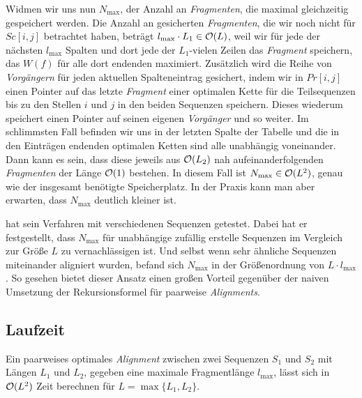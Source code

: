 Widmen wir uns nun $N_{\max}$, der Anzahl an \emph{Fragmenten}, die maximal gleichzeitig gespeichert werden. Die Anzahl an gesicherten \emph{Fragmenten}, die wir noch nicht für $Sc[i,j]$ betrachtet haben, beträgt $l_{\max} \cdot L_1 \in \mathcal{O}(L)$, weil wir für jede der nächsten $l_{\max}$ Spalten und dort jede der $L_1$-vielen Zeilen das \emph{Fragment} speichern, das $W(f)$ für alle dort endenden maximiert. Zusätzlich wird die Reihe von \emph{Vorgängern} für jeden aktuellen Spalteneintrag gesichert, indem wir in $Pr[i,j]$ einen Pointer auf das letzte \emph{Fragment} einer optimalen Kette für die Teilsequenzen bis zu den Stellen $i$ und $j$ in den beiden Sequenzen speichern. Dieses wiederum speichert einen Pointer auf seinen eigenen \emph{Vorgänger} und so weiter. Im schlimmsten Fall befinden wir uns in der letzten Spalte der Tabelle und die in den Einträgen endenden optimalen Ketten sind alle unabhängig voneinander. Dann kann es sein, dass diese jeweils aus $\mathcal{O}(L_2)$ nah aufeinanderfolgenden \emph{Fragmenten} der Länge $\mathcal{O}(1)$ bestehen. In diesem Fall ist $N_{\max} \in \mathcal{O}(L^2)$, genau wie der insgesamt benötigte Speicherplatz. In der Praxis kann man aber erwarten, dass $N_{\max}$ deutlich kleiner ist. 

\cite{m02} hat sein Verfahren mit verschiedenen Sequenzen getestet. Dabei hat er festgestellt, dass $N_{\max}$ für unabhängige zufällig erstelle Sequenzen im Vergleich zur Größe $L$ zu vernachlässigen ist. Und selbst wenn sehr ähnliche Sequenzen miteinander aligniert wurden, befand sich $N_{\max}$ in der Größenordnung von $L \cdot l_{\max}$. So gesehen bietet dieser Ansatz einen großen Vorteil gegenüber der naiven Umsetzung der Rekursionsformel für paarweise \emph{Alignments}.

\subsection{Laufzeit}

\begin{satz}
	Ein paarweises optimales \emph{Alignment} zwischen zwei Sequenzen $S_1$ und $S_2$ mit Längen $L_1$ und $L_2$, gegeben eine maximale Fragmentlänge $l_{\max}$, lässt sich in $\mathcal{O}(L^2)$ Zeit berechnen für $L = \max\{L_1, L_2\}$.
\end{satz}

